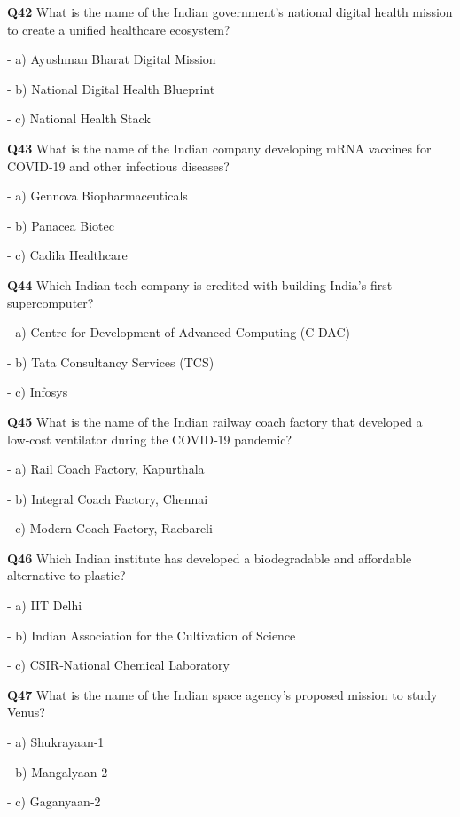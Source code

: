 \textbf{Q42} What is the name of the Indian government's national digital health mission to create a unified healthcare ecosystem?\par
\quad - a) Ayushman Bharat Digital Mission\par
\quad - b) National Digital Health Blueprint\par
\quad - c) National Health Stack\par

\textbf{Q43} What is the name of the Indian company developing mRNA vaccines for COVID‑19 and other infectious diseases?\par
\quad - a) Gennova Biopharmaceuticals\par
\quad - b) Panacea Biotec\par
\quad - c) Cadila Healthcare\par

\textbf{Q44} Which Indian tech company is credited with building India's first supercomputer?\par
\quad - a) Centre for Development of Advanced Computing (C‑DAC)\par
\quad - b) Tata Consultancy Services (TCS)\par
\quad - c) Infosys\par

\textbf{Q45} What is the name of the Indian railway coach factory that developed a low‑cost ventilator during the COVID‑19 pandemic?\par
\quad - a) Rail Coach Factory, Kapurthala\par
\quad - b) Integral Coach Factory, Chennai\par
\quad - c) Modern Coach Factory, Raebareli\par

\textbf{Q46} Which Indian institute has developed a biodegradable and affordable alternative to plastic?\par
\quad - a) IIT Delhi\par
\quad - b) Indian Association for the Cultivation of Science\par
\quad - c) CSIR‑National Chemical Laboratory\par

\textbf{Q47} What is the name of the Indian space agency's proposed mission to study Venus?\par
\quad - a) Shukrayaan‑1\par
\quad - b) Mangalyaan‑2\par
\quad - c) Gaganyaan‑2\par


